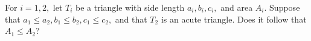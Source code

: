 For $i=1,2,$ let $T_i$ be a triangle with side length $a_i,b_i,c_i,$ and area $A_i.$ Suppose that $a_1\le a_2, b_1\le b_2, c_1\le c_2,$ and that $T_2$ is an acute triangle. Does it follow that $A_1\le A_2$?